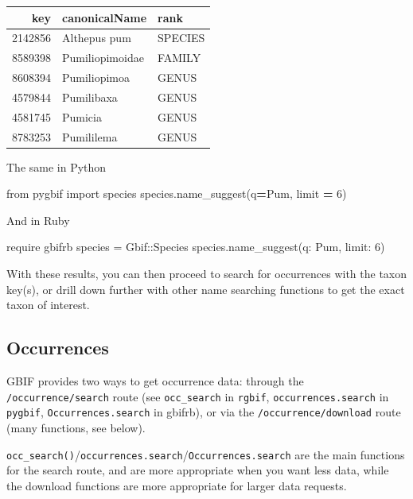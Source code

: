 \documentclass[3p]{elsarticle} %
\newenvironment{Shaded}{\begin{snugshade}}{\end{snugshade}}
\newcommand{\DataTypeTok}[1]{\textcolor[rgb]{0.13,0.29,0.53}{#1}}
\newcommand{\DecValTok}[1]{\textcolor[rgb]{0.00,0.00,0.81}{#1}}
\newcommand{\ImportTok}[1]{#1}
\newcommand{\NormalTok}[1]{#1}
\newcommand{\OperatorTok}[1]{\textcolor[rgb]{0.81,0.36,0.00}{\textbf{#1}}}
\newcommand{\StringTok}[1]{\textcolor[rgb]{0.31,0.60,0.02}{#1}}
\begin{document}
\begin{longtable}[]{@{}rll@{}}
\toprule
key & canonicalName & rank\tabularnewline
\midrule
\endhead
2142856 & Althepus pum & SPECIES\tabularnewline
8589398 & Pumiliopimoidae & FAMILY\tabularnewline
8608394 & Pumiliopimoa & GENUS\tabularnewline
4579844 & Pumilibaxa & GENUS\tabularnewline
4581745 & Pumicia & GENUS\tabularnewline
8783253 & Pumililema & GENUS\tabularnewline
\bottomrule
\end{longtable}

The same in Python

\begin{Shaded}
\begin{Highlighting}[]
\ImportTok{from}\NormalTok{ pygbif }\ImportTok{import}\NormalTok{ species}
\NormalTok{species.name\_suggest(q}\OperatorTok{=}\StringTok{\textquotesingle{}Pum\textquotesingle{}}\NormalTok{, limit }\OperatorTok{=} \DecValTok{6}\NormalTok{)}
\end{Highlighting}
\end{Shaded}

And in Ruby

\begin{Shaded}
\begin{Highlighting}[]
\NormalTok{require }\StringTok{\textquotesingle{}gbifrb\textquotesingle{}}
\NormalTok{species = }\DataTypeTok{Gbif}\NormalTok{::}\DataTypeTok{Species}
\NormalTok{species.name\_suggest(}\StringTok{q: \textquotesingle{}Pum\textquotesingle{}}\NormalTok{, }\StringTok{limit: }\DecValTok{6}\NormalTok{)}
\end{Highlighting}
\end{Shaded}

With these results, you can then proceed to search for occurrences with
the taxon key(s), or drill down further with other name searching
functions to get the exact taxon of interest.

\hypertarget{occurrences}{%
\subsection{Occurrences}\label{occurrences}}

GBIF provides two ways to get occurrence data: through the
\texttt{/occurrence/search} route (see \texttt{occ\_search} in
\texttt{rgbif}, \texttt{occurrences.search} in \texttt{pygbif},
\texttt{Occurrences.search} in gbifrb), or via the
\texttt{/occurrence/download} route (many functions, see below).

\texttt{occ\_search()}/\texttt{occurrences.search}/\texttt{Occurrences.search}
are the main functions for the search route, and are more appropriate
when you want less data, while the download functions are more
appropriate for larger data requests.
\end{document}
